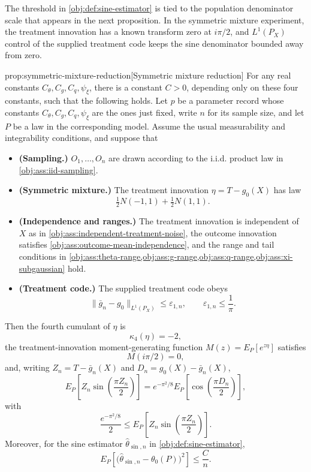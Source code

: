 \documentclass[11pt]{article}
\begin{document}
The threshold in \cref{obj:def:sine-estimator} is tied to the population denominator scale that appears in the next proposition. In the symmetric mixture experiment, the treatment innovation has a known transform zero at \(i\pi/2\), and \(L^1(P_X)\) control of the supplied treatment code keeps the sine denominator bounded away from zero.

\begin{propositionv}{prop:symmetric-mixture-reduction}[Symmetric mixture reduction]
For any real constants \(C_{\theta},C_g,C_q,\psi_{\xi}\), there is a constant \(C>0\), depending only on these four constants, such that the following holds.  Let \(p\) be a parameter record whose constants \(C_{\theta},C_g,C_q,\psi_{\xi}\) are the ones just fixed, write \(n\) for its sample size, and let \(P\) be a law in the corresponding model.  Assume the usual measurability and integrability conditions, and suppose that
\begin{itemize}
\item \textbf{(Sampling.)} \(O_1,\ldots,O_n\) are drawn according to the i.i.d. product law in \cref{obj:ass:iid-sampling}.
\item \textbf{(Symmetric mixture.)} The treatment innovation \(\eta=T-g_0(X)\) has law
\[
\tfrac12 N(-1,1)+\tfrac12 N(1,1).
\]
\item \textbf{(Independence and ranges.)} The treatment innovation is independent of \(X\) as in \cref{obj:ass:independent-treatment-noise}, the outcome innovation satisfies \cref{obj:ass:outcome-mean-independence}, and the range and tail conditions in \cref{obj:ass:theta-range,obj:ass:g-range,obj:ass:q-range,obj:ass:xi-subgaussian} hold.
\item \textbf{(Treatment code.)} The supplied treatment code obeys
\[
\|\bar g_n-g_0\|_{L^1(P_X)}\le \varepsilon_{1,n},
\qquad
\varepsilon_{1,n}\le \frac1\pi .
\]
\end{itemize}
Then the fourth cumulant of \(\eta\) is
\[
\kappa_4(\eta)=-2,
\]
the treatment-innovation moment-generating function \(M(z)=E_P[e^{z\eta}]\) satisfies
\[
M(i\pi/2)=0,
\]
and, writing \(Z_n=T-\bar g_n(X)\) and \(D_n=g_0(X)-\bar g_n(X)\),
\[
E_P\!\left[
Z_n\sin\!\left(\frac{\pi Z_n}{2}\right)
\right]
=
e^{-\pi^2/8}
E_P\!\left[
\cos\!\left(\frac{\pi D_n}{2}\right)
\right],
\]
with
\[
\frac{e^{-\pi^2/8}}{2}
\le
E_P\!\left[
Z_n\sin\!\left(\frac{\pi Z_n}{2}\right)
\right].
\]
Moreover, for the sine estimator \(\widehat\theta_{\sin,n}\) in \cref{obj:def:sine-estimator},
\[
E_P\!\left[
\bigl(\widehat\theta_{\sin,n}-\theta_0(P)\bigr)^2
\right]
\le
\frac{C}{n}.
\]
\end{propositionv}
\end{document}
